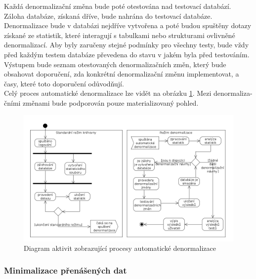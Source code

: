 \documentclass[ing,male,java,dept456]{diploma}						%
\begin{document}
Každá denormalizační změna bude poté otestována nad testovací databází. Záloha databáze, získaná dříve, bude nahrána do testovací databáze. Denormalizace bude v databázi nejdříve vytvořena a poté budou spuštěny dotazy získané ze statistik, které interagují s tabulkami nebo strukturami ovlivněné denormalizací. Aby byly zaručeny stejné podmínky pro všechny testy, bude vždy před každým testem databáze převedena do stavu v jakém byla před testováním. \\
Výstupem bude seznam otestovaných denormalizačních změn, který bude obsahovat doporučení, zda konkrétní denormalizační změnu implementovat, a časy, které toto doporučení odůvodňují. \\
Celý proces automatické denormalizace lze vidět na obrázku \ref{fig:Autoden}. Mezi denormaliza- čními změnami bude podporován pouze materializovaný pohled.

\begin{figure}[h!]
    \centering
    \includegraphics[width=150mm]{autodenormalizace.png}
    \caption{Diagram aktivit zobrazující procesy automatické denormalizace}
    \label{fig:Autoden}
\end{figure}

\subsubsection{Minimalizace přenášených dat}
\end{document}
